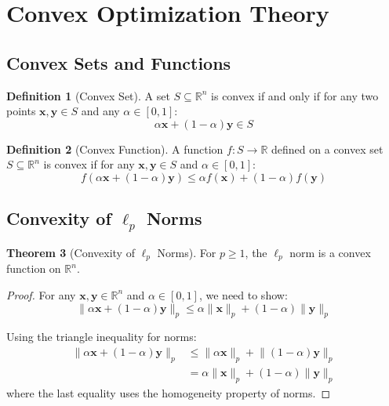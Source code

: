 \documentclass[12pt]{article}
\renewcommand{\vec}[1]{\mathbf{#1}}
\newcommand{\norm}[1]{\lVert#1\rVert}
\newcommand{\R}{\mathbb{R}}
\theoremstyle{definition}
\newtheorem{theorem}{Theorem}[section]
\newtheorem{definition}[theorem]{Definition}
\begin{document}
\newpage

\section{Convex Optimization Theory}

\subsection{Convex Sets and Functions}

\begin{definition}[Convex Set]
    A set $S \subseteq \R^n$ is convex if and only if for any two points $\vec{x}, \vec{y} \in S$ and any $\alpha \in [0, 1]$:
    \begin{equation}
        \alpha \vec{x} + (1 - \alpha) \vec{y} \in S
    \end{equation}
\end{definition}

\begin{definition}[Convex Function]
    A function $f: S \to \R$ defined on a convex set $S \subseteq \R^n$ is convex if for any $\vec{x}, \vec{y} \in S$ and $\alpha \in [0, 1]$:
    \begin{equation}
        f(\alpha \vec{x} + (1 - \alpha) \vec{y}) \leq \alpha f(\vec{x}) + (1 - \alpha) f(\vec{y})
    \end{equation}
\end{definition}

\subsection{Convexity of $\ell_p$ Norms}

\begin{theorem}[Convexity of $\ell_p$ Norms]
    For $p \geq 1$, the $\ell_p$ norm is a convex function on $\R^n$.
\end{theorem}

\begin{proof}
    For any $\vec{x}, \vec{y} \in \R^n$ and $\alpha \in [0, 1]$, we need to show:
    \begin{equation}
        \norm{\alpha \vec{x} + (1 - \alpha) \vec{y}}_p \leq \alpha \norm{\vec{x}}_p + (1 - \alpha) \norm{\vec{y}}_p
    \end{equation}

    Using the triangle inequality for norms:
    \begin{align}
        \norm{\alpha \vec{x} + (1 - \alpha) \vec{y}}_p & \leq \norm{\alpha \vec{x}}_p + \norm{(1 - \alpha) \vec{y}}_p \\
                                                       & = \alpha \norm{\vec{x}}_p + (1 - \alpha) \norm{\vec{y}}_p
    \end{align}
    where the last equality uses the homogeneity property of norms.
\end{proof}
\end{document}
